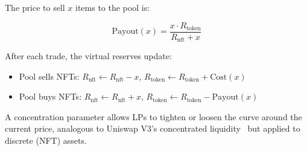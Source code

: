 The price to sell $x$ items to the pool is:

\begin{equation}\label{eq:xyk-sell}
\text{Payout}(x) = \frac{x \cdot R_{\text{token}}}{R_{\text{nft}} + x}
\end{equation}

After each trade, the virtual reserves update:
\begin{itemize}[nosep]
  \item Pool sells NFTs:
    $R_{\text{nft}} \leftarrow R_{\text{nft}} - x$, \;
    $R_{\text{token}} \leftarrow R_{\text{token}} + \text{Cost}(x)$
  \item Pool buys NFTs:
    $R_{\text{nft}} \leftarrow R_{\text{nft}} + x$, \;
    $R_{\text{token}} \leftarrow R_{\text{token}} - \text{Payout}(x)$
\end{itemize}

A concentration parameter allows LPs to tighten or loosen the curve
around the current price, analogous to Uniswap V3's concentrated
liquidity~\cite{uniswapv3} but applied to discrete (NFT) assets.

